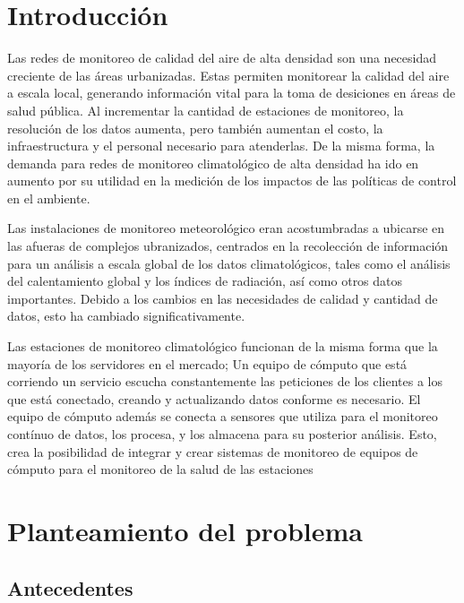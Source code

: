\section{Introducción}

Las redes de monitoreo de calidad del aire de alta densidad son una necesidad creciente de las áreas urbanizadas. Estas permiten monitorear la calidad del aire a escala local, generando información vital para la toma de desiciones en áreas de salud pública. Al incrementar la cantidad de estaciones de monitoreo, la resolución de los datos aumenta, pero también aumentan el costo, la infraestructura y el personal necesario para atenderlas\cite{urban_air_quality}. De la misma forma, la demanda para redes de monitoreo climatológico de alta densidad ha ido en aumento por su utilidad en la medición de los impactos de las políticas de control en el ambiente\cite{muller_sensors_and_the_city}.

Las instalaciones de monitoreo meteorológico eran acostumbradas a ubicarse en las afueras de complejos ubranizados, centrados en la recolección de información para un análisis a escala global de los datos climatológicos, tales como el análisis del calentamiento global y los índices de radiación, así como otros datos importantes. Debido a los cambios en las necesidades de calidad y cantidad de datos, esto ha cambiado significativamente\cite{oke_2004}.

Las estaciones de monitoreo climatológico funcionan de la misma forma que la mayoría de los servidores en el mercado; Un equipo de cómputo que está corriendo un servicio escucha constantemente las peticiones de los clientes a los que está conectado, creando y actualizando datos conforme es necesario. El equipo de cómputo además se conecta a sensores que utiliza para el monitoreo contínuo de datos, los procesa, y los almacena para su posterior análisis. Esto, crea la posibilidad de integrar y crear sistemas de monitoreo de equipos de cómputo para el monitoreo de la salud de las estaciones

\pagebreak

\section{Planteamiento del problema}

\subsection{Antecedentes}

